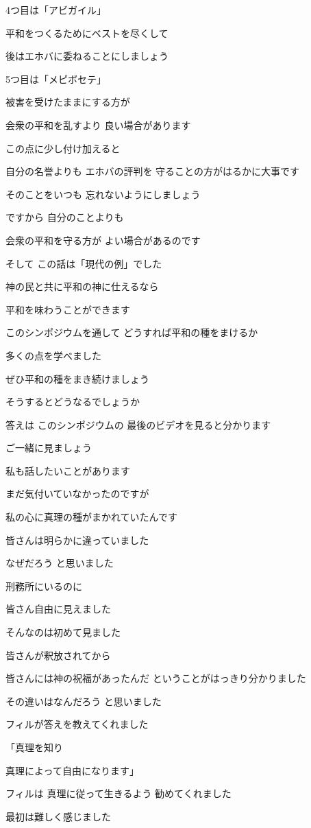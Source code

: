 \documentclass[twocolumn]{jsarticle}
\begin{document}
4つ目は「アビガイル」

平和をつくるためにベストを尽くして

後はエホバに委ねることにしましょう

5つ目は「メピボセテ」

被害を受けたままにする方が

会衆の平和を乱すより
良い場合があります

この点に少し付け加えると

自分の名誉よりも エホバの評判を
守ることの方がはるかに大事です

そのことをいつも
忘れないようにしましょう

ですから 自分のことよりも

会衆の平和を守る方が
よい場合があるのです

そして この話は「現代の例」でした

神の民と共に平和の神に仕えるなら

平和を味わうことができます

このシンポジウムを通して
どうすれば平和の種をまけるか

多くの点を学べました

ぜひ平和の種をまき続けましょう

そうするとどうなるでしょうか

答えは このシンポジウムの
最後のビデオを見ると分かります

ご一緒に見ましょう

私も話したいことがあります

まだ気付いていなかったのですが

私の心に真理の種がまかれていたんです

皆さんは明らかに違っていました

なぜだろう と思いました

刑務所にいるのに

皆さん自由に見えました

そんなのは初めて見ました

皆さんが釈放されてから

皆さんには神の祝福があったんだ
ということがはっきり分かりました

その違いはなんだろう と思いました

フィルが答えを教えてくれました

「真理を知り

真理によって自由になります」

フィルは 真理に従って生きるよう
勧めてくれました

最初は難しく感じました
\end{document}
